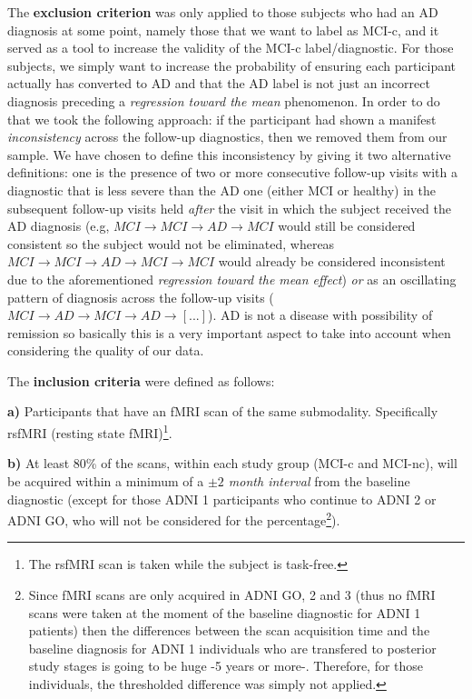 \documentclass[a4paper,12pt]{elsarticle}  %
\begin{document}
	The \textbf{exclusion criterion} was only applied to those subjects who had an AD diagnosis at some point, namely those that we want to label as MCI-c, and it served as a tool to increase the validity of the MCI-c label/diagnostic. For those subjects, we simply want to increase the probability of ensuring each participant actually has converted to AD and that the AD label is not just an incorrect diagnosis preceding a \textit{regression toward the mean} phenomenon. In order to do that we took the following approach: if the participant had shown a manifest \textit{inconsistency} across the follow-up diagnostics, then we removed them from our sample. We have chosen to define this inconsistency by giving it two alternative definitions: one is the presence of two or more consecutive follow-up visits with a diagnostic that is less severe than the AD one (either MCI or healthy) in the subsequent follow-up visits held \textit{after} the visit in which the subject received the AD diagnosis (e.g, $MCI \rightarrow MCI \rightarrow AD \rightarrow MCI$ would still be considered consistent so the subject would not be eliminated, whereas  $ MCI \rightarrow MCI \rightarrow AD \rightarrow MCI \rightarrow MCI$ would already be considered inconsistent due to the aforementioned \textit{regression toward the mean effect}) \textit{or} as an oscillating pattern of diagnosis across the follow-up visits ($MCI \rightarrow AD \rightarrow MCI \rightarrow AD \rightarrow [...]$). AD is not a disease with possibility of remission so basically this is a very important aspect to take into account when considering the quality of our data.
	
	\noindent The \textbf{inclusion criteria} were defined as follows:
	
	
	
	
	\textbf{a)} Participants that have an fMRI scan of the same submodality. Specifically rsfMRI (resting state fMRI)\footnote{The rsfMRI scan is taken while the subject is task-free.}.
	
	\textbf{b)} At least 80\% of the scans, within each study group (MCI-c and MCI-nc), will be acquired within a minimum of a \textit{$\pm 2 $ month interval} from the baseline diagnostic (except for those ADNI 1 participants who continue to ADNI 2 or ADNI GO, who will not be considered for the percentage\footnote{Since fMRI scans are only acquired in ADNI GO, 2 and 3 (thus no fMRI scans were taken at the moment of the baseline diagnostic for ADNI 1 patients) then the differences between the scan acquisition time and the baseline diagnosis for ADNI 1 individuals who are transfered to posterior study stages is going to be huge -5 years or more-. Therefore, for those individuals, the thresholded difference was simply not applied.}).
	
\end{document}
